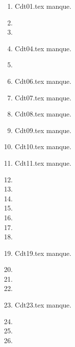 \begin{enumerate}
  \item Cdt01.tex manque. 
  \item  
  \item  
  \item Cdt04.tex manque. 
  \item  
  \item Cdt06.tex manque. 
  \item Cdt07.tex manque. 
  \item Cdt08.tex manque. 
  \item Cdt09.tex manque. 
  \item Cdt10.tex manque. 
  \item Cdt11.tex manque. 
  \item  
  \item  
  \item  
  \item  
  \item  
  \item  
  \item  
  \item Cdt19.tex manque. 
  \item  
  \item  
  \item  
  \item Cdt23.tex manque. 
  \item  
  \item  
  \item  
\end{enumerate} 
